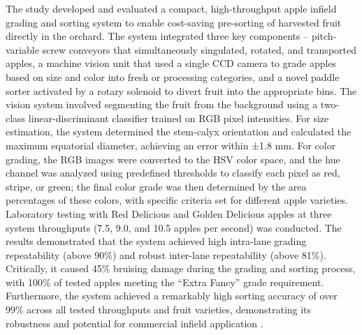 {The study developed and evaluated a compact, high-throughput apple infield grading and sorting system to enable cost-saving pre-sorting of harvested fruit directly in the orchard. The system integrated three key components – pitch-variable screw conveyors that simultaneously singulated, rotated, and transported apples, a machine vision unit that used a single CCD camera to grade apples based on size and color into fresh or processing categories, and a novel paddle sorter activated by a rotary solenoid to divert fruit into the appropriate bins. The vision system involved segmenting the fruit from the background using a two-class linear-discriminant classifier trained on RGB pixel intensities. For size estimation, the system determined the stem-calyx orientation and calculated the maximum equatorial diameter, achieving an error within ±1.8 mm. For color grading, the RGB images were converted to the HSV color space, and the hue channel was analyzed using predefined thresholds to classify each pixel as red, stripe, or green; the final color grade was then determined by the area percentages of these colors, with specific criteria set for different apple varieties. Laboratory testing with Red Delicious and Golden Delicious apples at three system throughputs (7.5, 9.0, and 10.5 apples per second) was conducted. The results demonstrated that the system achieved high intra-lane grading repeatability (above 90\%) and robust inter-lane repeatability (above 81\%). Critically, it caused 45\% bruising damage during the grading and sorting process, with 100\% of tested apples meeting the “Extra Fancy” grade requirement. Furthermore, the system achieved a remarkably high sorting accuracy of over 99\% across all tested throughputs and fruit varieties, demonstrating its robustness and potential for commercial infield application \citep{zhang2021development}.


}
